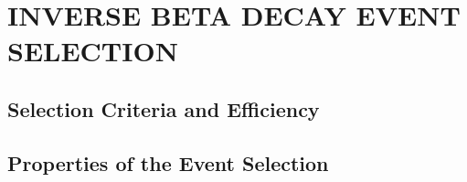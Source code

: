 \chapter{\uppercase{Inverse Beta Decay Event Selection}}

\section{Selection Criteria and Efficiency}

\section{Properties of the Event Selection}


